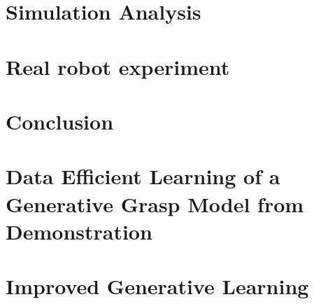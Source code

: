 \documentclass{ws-ijhr}
\begin{document}
\section{Simulation Analysis}
\label{section:simulationAnalysis}


\section{Real robot experiment}
\label{section:experiments}


\section{Conclusion} 
\label{sec:conclusion}




\appendix  %

%

\section{Data Efficient Learning of a Generative Grasp Model from Demonstration}

 \label{section:generative}

\section{Improved Generative Learning}
\end{document}
